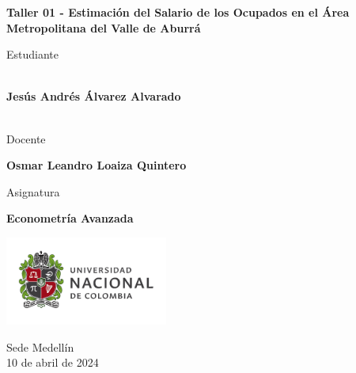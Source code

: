 \begin{titlepage}
   \Large{
   \begin{center}
       \vspace*{1cm}

       \textbf{Taller 01 - Estimación del Salario de los Ocupados en el Área Metropolitana del Valle de Aburrá}

            
       \vspace{1.5cm}
       
       Estudiante
       
       \vspace{0.5cm}
        
	\textbf{}\\    

	\textbf{Jesús Andrés Álvarez Alvarado}\\

	\textbf{}\\

              \vspace{1cm}
       
       Docente
       
       \vspace{0.5cm}

       \textbf{Osmar Leandro Loaiza Quintero}
       
       \vspace{0.4cm}

       \vspace{1.4cm}
       
       Asignatura
       
       \vspace{0.5cm}

       \textbf{Econometría Avanzada}

       \vfill

            
       \vspace{0.4cm}
     
       \includegraphics[width=0.4\textwidth]{logounal.png}
            
       Sede Medellín\\
       10 de abril de 2024
       
   \end{center}
   }
\end{titlepage}